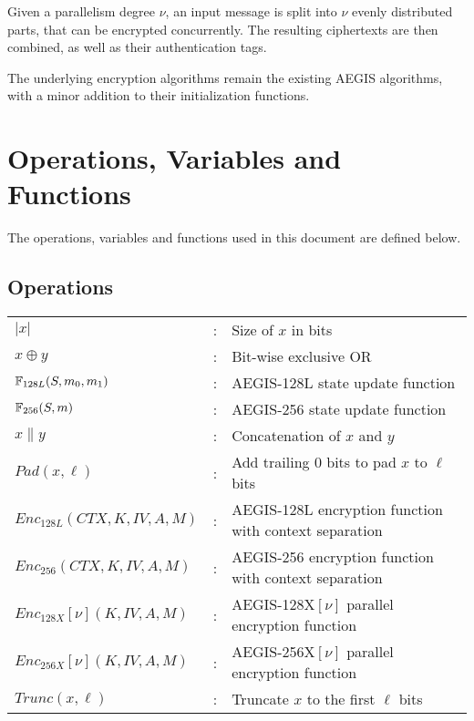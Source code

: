 \documentclass[envcountsame,runningheads,notitlepage]{llncs}
\begin{document}
Given a parallelism degree $\nu$, an input message is split into $\nu$ evenly distributed parts, that can be encrypted concurrently. The resulting ciphertexts are then combined, as well as their authentication tags.

The underlying encryption algorithms remain the existing AEGIS algorithms, with a minor addition to their initialization functions.

\section{Operations, Variables and Functions}
\label{sec:notation}

The operations, variables and functions used in this document are defined below.

\subsection{Operations}

\begin{tabular}{l c p{}}
$\lvert x \rvert$              & : & Size of $x$ in bits                                    \\
  $x \oplus y$                   & : & Bit-wise exclusive OR                                  \\
  $\mathbb{F}_{128L}(S, m_0, m_1)$       & : & AEGIS-128L state update function                       \\
  $\mathbb{F}_{256}(S, m)$               & : & AEGIS-256 state update function                        \\
  $x \| y$                       & : & Concatenation of $x$ and $y$                           \\
  $Pad(x,\ell)$                  & : & Add trailing $0$ bits to pad $x$ to $\ell$ bits        \\
  $Enc_{128L}(CTX, K, IV, A, M)$ & : & AEGIS-128L encryption function with context separation \\
  $Enc_{256}(CTX, K, IV, A, M)$  & : & AEGIS-256 encryption function with context separation  \\
$Enc_{128X}[\nu](K, IV, A, M)$  & : & AEGIS-128X$[\nu]$ parallel encryption function         \\
$Enc_{256X}[\nu](K, IV, A, M)$  & : & AEGIS-256X$[\nu]$ parallel encryption function         \\
  $Trunc(x, \ell)$               & : & Truncate $x$ to the first $\ell$ bits                  \\
\end{tabular}
\end{document}
